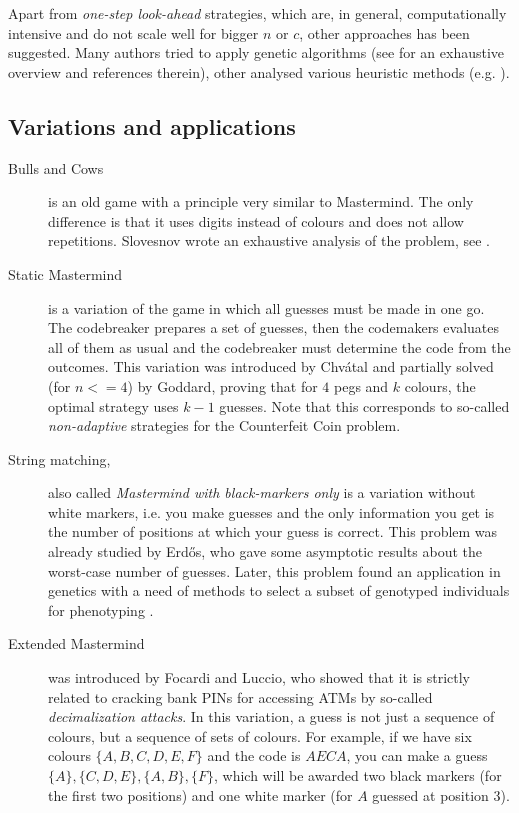 Apart from \emph{one-step look-ahead} strategies, which are, in general,
  computationally intensive and do not scale well for bigger $n$ or $c$,
  other approaches has been suggested.
Many authors tried to apply genetic algorithms
  (see \cite{mm-ga} for an exhaustive overview and references therein),
  other analysed various heuristic methods (e.g. \cite{mm-heuristic}).

\subsection{Variations and applications}

\begin{description}
\item[Bulls and Cows]
is an old game with a principle very similar to Mastermind.
The only difference is that it uses digits instead of colours and does not allow repetitions.
Slovesnov wrote an exhaustive analysis of the problem, see \cite{bullsandcows}.


\item[Static Mastermind] is a variation of the game in which all guesses
  must be made in one go.
The codebreaker prepares a set of guesses,
  then the codemakers evaluates all of them as usual and
  the codebreaker must determine the code from the outcomes.
This variation was introduced by Chvátal\cite{mm-chvatal} and
  partially solved (for $n<=4$) by Goddard\cite{mm-static},
  proving that for $4$ pegs and $k$ colours,
  the optimal strategy uses $k-1$ guesses.
Note that this corresponds to so-called \emph{non-adaptive} strategies
  for the Counterfeit Coin problem.

\item[String matching,] also called
  \emph{Mastermind with black-markers only}
  is a variation without white markers, i.e.
  you make guesses and the only information you get is the
  number of positions at which your guess is correct.
This problem was already studied by Erdős\cite{erdos-two}, who gave some
  asymptotic results about the worst-case number of guesses.
Later, this problem found an application in genetics with a need of
  methods to select a subset of genotyped individuals for phenotyping
  \cite{mm-app-gen2}\cite{mm-app-gen}.

\item[Extended Mastermind] was introduced by Focardi and Luccio,
  who showed that it is strictly related to cracking bank PINs for accessing ATMs
  by so-called \emph{decimalization attacks}\cite{mm-pins}.
In this variation, a guess is not just a sequence of colours, but a sequence of
  sets of colours. For example, if we have six colours $\{A, B, C, D, E, F\}$
  and the code is $AECA$,
  you can make a guess $\{A\}, \{C,D,E\}, \{A,B\}, \{F\}$, which
  will be awarded two black markers (for the first two positions)
  and one white marker (for $A$ guessed at position 3).
\end{description}

